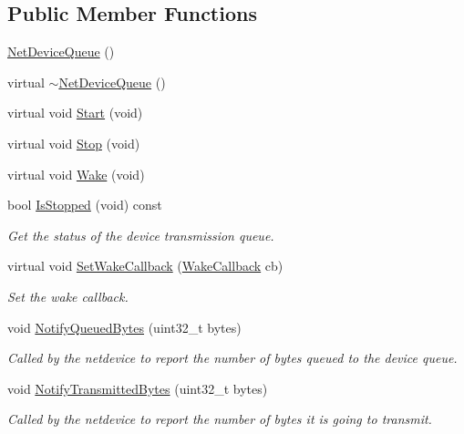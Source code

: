 \subsection*{Public Member Functions}
\begin{DoxyCompactItemize}
\item 
\hyperlink{classns3_1_1NetDeviceQueue_a1fd96da76b4b0f83f18e4ca7f6892713}{Net\+Device\+Queue} ()
\item 
virtual \hyperlink{classns3_1_1NetDeviceQueue_a20ac6106fe315652e8e0b8977b20b395}{$\sim$\+Net\+Device\+Queue} ()
\item 
virtual void \hyperlink{classns3_1_1NetDeviceQueue_aaa749761cdf8daf3424953b2ce77fca3}{Start} (void)
\item 
virtual void \hyperlink{classns3_1_1NetDeviceQueue_a7890ad382a288dd85dd25e0de8f75f3d}{Stop} (void)
\item 
virtual void \hyperlink{classns3_1_1NetDeviceQueue_a587aa3b6c3e66da41951a6a05604246f}{Wake} (void)
\item 
bool \hyperlink{classns3_1_1NetDeviceQueue_a577d4ced8ac8e0bbe655545bdd5722f7}{Is\+Stopped} (void) const 
\begin{DoxyCompactList}\small\item\em Get the status of the device transmission queue. \end{DoxyCompactList}\item 
virtual void \hyperlink{classns3_1_1NetDeviceQueue_afd7c9f18ad2cabc2624a764702d46a2b}{Set\+Wake\+Callback} (\hyperlink{classns3_1_1NetDeviceQueue_af33b3e91885b68cc983c87b131826300}{Wake\+Callback} cb)
\begin{DoxyCompactList}\small\item\em Set the wake callback. \end{DoxyCompactList}\item 
void \hyperlink{classns3_1_1NetDeviceQueue_a6de25696a8c8aefa7a7eccd7d69bfc63}{Notify\+Queued\+Bytes} (uint32\+\_\+t bytes)
\begin{DoxyCompactList}\small\item\em Called by the netdevice to report the number of bytes queued to the device queue. \end{DoxyCompactList}\item 
void \hyperlink{classns3_1_1NetDeviceQueue_a6aa75fa77fba0ea27ffa8c135112f1b3}{Notify\+Transmitted\+Bytes} (uint32\+\_\+t bytes)
\begin{DoxyCompactList}\small\item\em Called by the netdevice to report the number of bytes it is going to transmit. \end{DoxyCompactList}\item 

\end{DoxyCompactItemize}
